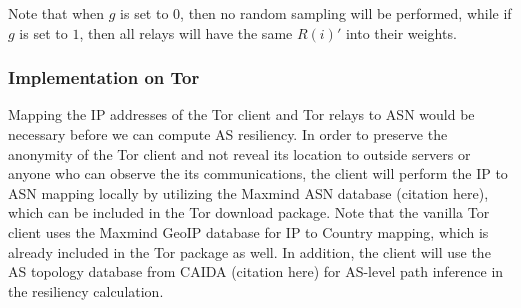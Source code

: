 %
%

Note that when $g$ is set to $0$, then no random sampling will be performed, while if $g$ is set to $1$, then all relays will have the same $R(i)\prime$ into their weights. 


\subsubsection{Implementation on Tor}
Mapping the IP addresses of the Tor client and Tor relays to ASN would be necessary before we can compute AS resiliency. In order to preserve the anonymity of the Tor client and not reveal its location to outside servers or anyone who can observe the its communications, the client will perform the IP to ASN mapping locally by utilizing the Maxmind ASN database (citation here), which can be included in the Tor download package. Note that the vanilla Tor client uses the Maxmind GeoIP database for IP to Country mapping, which is already included in the Tor package as well. In addition, the client will use the AS topology database from CAIDA (citation here) for AS-level path inference in the resiliency calculation. 

